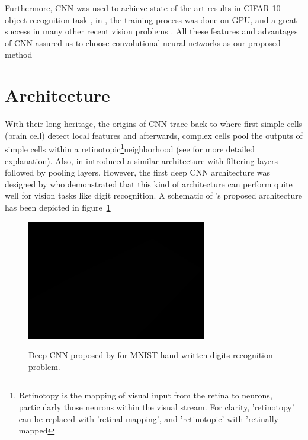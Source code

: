 Furthermore, CNN was used to achieve state-of-the-art results in CIFAR-10 object recognition task \cite{cirecsan2012multi}, in \cite{russakovsky2015imagenet}, the training process was done on GPU, and a great success in many other recent vision problems \cite{cirecsan2011convolutional, ciresan2015multi, wan2013regularization}. All these features and advantages of CNN assured us to choose convolutional neural networks as our proposed method

\section{Architecture}

With their long heritage, the origins of CNN trace back to \cite{hubel1962receptive} where first simple cells (brain cell) detect local features and afterwards, complex cells pool the outputs of simple cells within a retinotopic\footnote{Retinotopy is the mapping of visual input from the retina to neurons, particularly those neurons within the visual stream. For clarity, 'retinotopy' can be replaced with 'retinal mapping', and 'retinotopic' with 'retinally mapped}neighborhood (see \cite{hubel1962receptive} for more detailed explanation). Also, \citeauthor*{fukushima1975cognitron} in \cite{fukushima1975cognitron, fukushima1980neocognitron} introduced a similar architecture with filtering layers followed by pooling layers. However, the first deep CNN architecture was designed by \citealt{lecun1989backpropagation} who demonstrated that this kind of architecture can perform quite well for vision tasks like digit recognition. A schematic of \citeauthor{lecun1989backpropagation}'s proposed architecture has been depicted in figure~\ref{fig:lecun}

\begin{figure}[H]
	\centering
	{\includegraphics[width=0.7\textwidth]{images/1}}
	\caption{Deep CNN proposed by \citeauthor{lecun1989backpropagation} for MNIST hand-written digits recognition problem.}
	\label{fig:lecun}
\end{figure}

